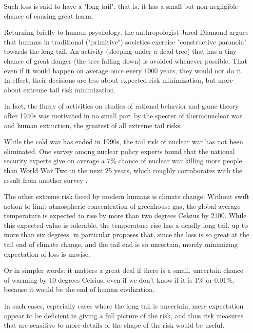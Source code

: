 Such loss is said to have a "long tail", that is, it has a small but non-negligible chance of causing great harm. 

Returning briefly to human psychology, the anthropologist Jared Diamond argues that \cite[Chapter 7]{diamondWorldYesterdayWhat2013} humans in traditional ("primitive") societies exercise "constructive paranoia" towards the long tail. An activity (sleeping under a dead tree) that has a tiny chance of great danger (the tree falling down) is avoided whenever possible. That even if it would happen on average once every 1000 years, they would not do it. In effect, their decisions are less about expected risk minimization, but more about extreme tail risk minimization. 

In fact, the flurry of activities on studies of rational behavior and game theory after 1940s was motivated in no small part by the specter of thermonuclear war and human extinction, the greatest of all extreme tail risks.

While the cold war has ended in 1990s, the tail risk of nuclear war has not been eliminated. One survey \cite{PS21SurveyExperts2015} among nuclear policy experts found that the national security experts give on average a 7\% chance of nuclear war killing more people than World War Two in the next 25 years, which roughly corroborates with the result from another survey \cite{bostromGlobalCatastrophicRisks2008}.

The other extreme risk faced by modern humans is climate change. Without swift action to limit atmospheric concentration of greenhouse gas, the global average temperature is expected to rise by more than two degrees Celsius by 2100. While this expected value is tolerable, the temperature rise has a deadly long tail, up to more than six degrees. \cite{weitzmanModelingInterpretingEconomics2009} in particular proposes that, since the loss is so great at the tail end of climate change, and the tail end is so uncertain, merely minimizing expectation of loss is unwise.

Or in simpler words: it matters a great deal if there is a small, uncertain chance of warming by 10 degrees Celsius, even if we don't know if it is 1\% or 0.01\%, because it would be the end of human civilization.

In such cases, especially cases where the long tail is uncertain, mere expectation appear to be deficient in giving a full picture of the risk, and thus risk measures that are sensitive to more details of the shape of the risk would be useful.


